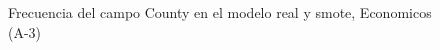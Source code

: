 \begin{figure}[H]
    \centering
    
    \caption{Frecuencia del campo County en el modelo real y smote, Economicos (A-3)}
    \label{frecuency-County-smote-enc}
\end{figure}